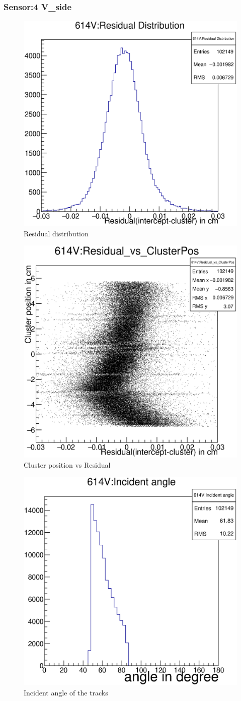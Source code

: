 \documentclass[12pt]{article}
\begin{document}
	\subsubsection{Sensor:4 V\_side}
	\begin{multicols}{3}
		\begin{figure}[H]
			\includegraphics[width=.3\textwidth]{614V:residualplot.eps}	
			\caption{Residual distribution}	
			\label{fig1}	
		\end{figure}
		\begin{figure}[H]
			\includegraphics[width=.3\textwidth]{614V:residual_vs_clusterpos.eps}	
			\caption{Cluster position vs Residual}	
			\label{fig2}	
		\end{figure}
		\begin{figure}[H]
			\includegraphics[width=.3\textwidth]{614V:incident_angle.eps}	
			\caption{Incident angle of the tracks}	
			\label{fig2}	
		\end{figure}
	\end{multicols}
	
\end{document}
